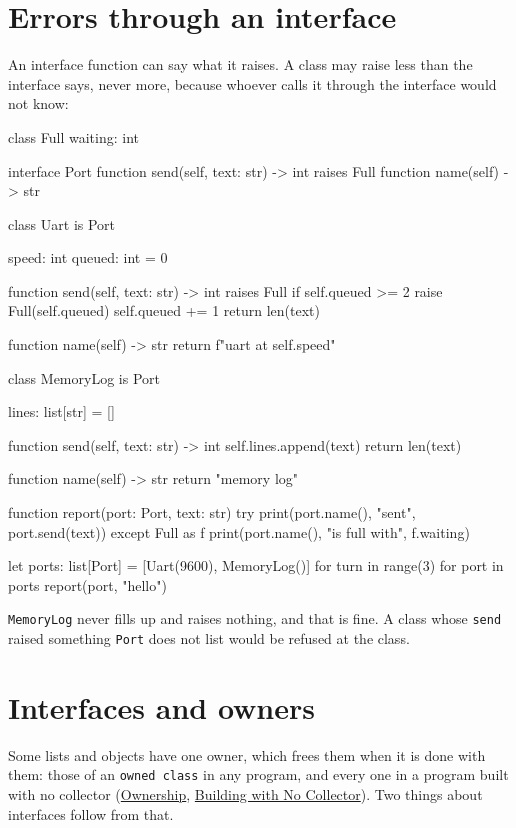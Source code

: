 \section{Errors through an interface}

An interface function can say what it raises. A class may raise less
than the interface says, never more, because whoever calls it through
the interface would not know:

\begin{zeno}
class Full {
    waiting: int
}

interface Port {
    function send(self, text: str) -> int raises Full
    function name(self) -> str
}

class Uart is Port {
    speed: int
    queued: int = 0

    function send(self, text: str) -> int raises Full {
        if self.queued >= 2 {
            raise Full(self.queued)
        }
        self.queued += 1
        return len(text)
    }

    function name(self) -> str {
        return f"uart at {self.speed}"
    }
}

class MemoryLog is Port {
    lines: list[str] = []

    function send(self, text: str) -> int {
        self.lines.append(text)
        return len(text)
    }

    function name(self) -> str {
        return "memory log"
    }
}

function report(port: Port, text: str) {
    try {
        print(port.name(), "sent", port.send(text))
    } except Full as f {
        print(port.name(), "is full with", f.waiting)
    }
}

let ports: list[Port] = [Uart(9600), MemoryLog()]
for turn in range(3) {
    for port in ports {
        report(port, "hello")
    }
}
\end{zeno}

\verb|MemoryLog| never fills up and raises nothing, and that is fine.
A class whose \verb|send| raised something \verb|Port| does not list
would be refused at the class.

\section{Interfaces and owners}

Some lists and objects have one owner, which frees them when it is
done with them: those of an \verb|owned class| in any program, and
every one in a program built with no collector
(\hyperref[ch-ownership]{Ownership},
\hyperref[ch-no-collector]{Building with No Collector}). Two things
about interfaces follow from that.

